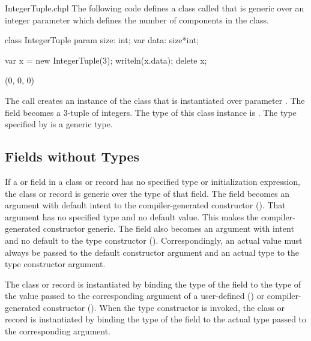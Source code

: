 \begin{chapelexample}{IntegerTuple.chpl}
The following code defines a class called  that is
generic over an integer parameter which defines the number of
components in the class.
\begin{chapel}
class IntegerTuple {
  param size: int;
  var data: size*int;
}
\end{chapel}
\begin{chapelpost}
var x = new IntegerTuple(3);
writeln(x.data);
delete x;
\end{chapelpost}
\begin{chapeloutput}
(0, 0, 0)
\end{chapeloutput}
The call  creates an instance of the
 class that is instantiated over parameter
.  The field  becomes a 3-tuple of integers.  The
type of this class instance is .  The type
specified by  is a generic type.
\end{chapelexample}

\subsection{Fields without Types}
\label{Fields_without_Types}

If a  or  field in a class or record has no specified type or
initialization expression, the class or record is generic over the
type of that field.  The field becomes an argument with default intent to
the compiler-generated constructor ().
That argument has no specified type and no default
value. This makes the compiler-generated constructor generic.
The field also becomes an argument with  intent and no default
to the type constructor ().
Correspondingly, an actual value must always be passed to the default
constructor argument and an actual type to the type constructor argument.

The class or record is instantiated by binding the type of the field
to the type of the value passed to the corresponding argument
of a user-defined () or compiler-generated constructor ().
When the type constructor is invoked, the class or record is instantiated
by binding the type of the field to the actual type passed to
the corresponding argument.

